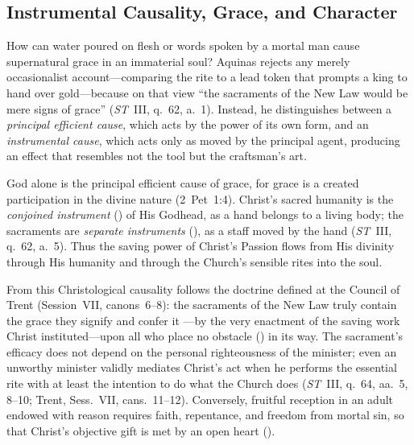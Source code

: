 \subsection{Instrumental Causality, Grace, and Character}
\label{subsec:causality-grace-character}

How can water poured on flesh or words spoken by a mortal man cause supernatural grace in an immaterial soul? Aquinas rejects any merely occasionalist account---comparing the rite to a lead token that prompts a king to hand over gold---because on that view ``the sacraments of the New Law would be mere signs of grace'' (\emph{ST}~III, q.~62, a.~1). Instead, he distinguishes between a \emph{principal efficient cause}, which acts by the power of its own form, and an \emph{instrumental cause}, which acts only as moved by the principal agent, producing an effect that resembles not the tool but the craftsman's art.

God alone is the principal efficient cause of grace, for grace is a created participation in the divine nature (2~Pet~1:4). Christ's sacred humanity is the \emph{conjoined instrument} () of His Godhead, as a hand belongs to a living body; the sacraments are \emph{separate instruments} (), as a staff moved by the hand (\emph{ST}~III, q.~62, a.~5). Thus the saving power of Christ's Passion flows from His divinity through His humanity and through the Church's sensible rites into the soul.

From this Christological causality follows the doctrine defined at the Council of Trent (Session~VII, canons~6--8): the sacraments of the New Law truly contain the grace they signify and confer it ---by the very enactment of the saving work Christ instituted---upon all who place no obstacle () in its way. The sacrament's efficacy does not depend on the personal righteousness of the minister; even an unworthy minister validly mediates Christ's act when he performs the essential rite with at least the intention to do what the Church does (\emph{ST}~III, q.~64, aa.~5, 8--10; Trent, Sess.~VII, cans.~11--12). Conversely, fruitful reception in an adult endowed with reason requires faith, repentance, and freedom from mortal sin, so that Christ's objective gift is met by an open heart ().

